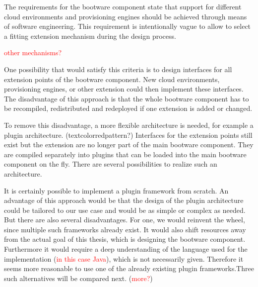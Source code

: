 The requirements for the bootware component state that support for different cloud environments and provisioning engines should be achieved through means of software engineering.
This requirement is intentionally vague to allow to select a fitting extension mechanism during the design process.

\textcolor{red}{other mechanisms?}

One possibility that would satisfy this criteria is to design interfaces for all extension points of the bootware component.
New cloud environments, provisioning engines, or other extension could then implement these interfaces.
The disadvantage of this approach is that the whole bootware component has to be recompiled, redistributed and redeployed if one extension is added or changed.

To remove this disadvantage, a more flexible architecture is needed, for example a plugin architecture. (textcolor{red}{pattern?})
Interfaces for the extension points still exist but the extension are no longer part of the main bootware component.
They are compiled separately into plugins that can be loaded into the main bootware component on the fly.
There are several possibilities to realize such an architecture.

It is certainly possible to implement a plugin framework from scratch.
An advantage of this approach would be that the design of the plugin architecture could be tailored to our use case and would be as simple or complex as needed.
But there are also several disadvantages.
For one, we would reinvent the wheel, since multiple such frameworks already exist.
It would also shift resources away from the actual goal of this thesis, which is designing the bootware component.
Furthermore it would require a deep understanding of the language used for the implementation (\textcolor{red}{in this case Java}), which is not necessarily given.
Therefore it seems more reasonable to use one of the already existing plugin frameworks.Three such alternatives will be compared next. (\textcolor{red}{more?})

